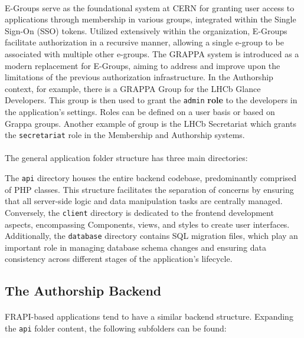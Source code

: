\paragraph{} E-Groups serve as the foundational system at CERN for granting user access to applications through membership in various groups, integrated within the Single Sign-On (SSO) tokens. Utilized extensively within the organization, E-Groups facilitate authorization in a recursive manner, allowing a single e-group to be associated with multiple other e-groups. The GRAPPA system is introduced as a modern replacement for E-Groups, aiming to address and improve upon the limitations of the previous authorization infrastructure. In the Authorship context, for example, there is a GRAPPA Group for the LHCb Glance Developers. This group is then used to grant the \verb|admin| \textbf{role} to the developers in the application's settings. Roles can be defined on a user basis or based on Grappa groups. Another example of group is the LHCb Secretariat which grants the \verb|secretariat| role in the Membership and Authorship systems.

\paragraph{} The general application folder structure has three main directories:

The \verb|api| directory houses the entire backend codebase, predominantly comprised of PHP classes. This structure facilitates the separation of concerns by ensuring that all server-side logic and data manipulation tasks are centrally managed. Conversely, the \verb|client| directory is dedicated to the frontend development aspects, encompassing Components, views, and styles to create user interfaces. Additionally, the \verb|database| directory contains SQL migration files, which play an important role in managing database schema changes and ensuring data consistency across different stages of the application's lifecycle.

\subsection{The Authorship Backend}

\paragraph{} FRAPI-based applications tend to have a similar backend structure. Expanding the \verb|api| folder content, the following subfolders can be found:

